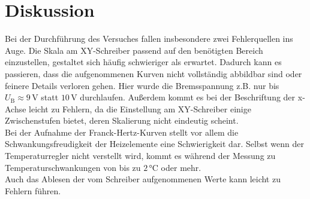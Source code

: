 \section{Diskussion}

Bei der Durchführung des Versuches fallen insbesondere zwei Fehlerquellen ins Auge.
Die Skala am XY-Schreiber passend auf den benötigten Bereich einzustellen, gestaltet sich häufig schwieriger als erwartet.
Dadurch kann es passieren, dass die aufgenommenen Kurven nicht vollständig abbildbar sind oder feinere Details verloren gehen.
Hier wurde die Bremsspannung z.B. nur bis $U_\text{B} \approx 9 \,\unit{\volt}$ statt $10 \,\unit{\volt}$ durchlaufen.
Außerdem kommt es bei der Beschriftung der x-Achse leicht zu Fehlern, da die Einstellung am XY-Schreiber einige Zwischenstufen bietet, deren Skalierung nicht eindeutig scheint. \\

Bei der Aufnahme der Franck-Hertz-Kurven stellt vor allem die Schwankungsfreudigkeit der Heizelemente eine Schwierigkeit dar.
Selbst wenn der Temperaturregler nicht verstellt wird, kommt es während der Messung zu Temperaturschwankungen von bis zu $2 \,\unit{\celsius}$ oder mehr. \\

Auch das Ablesen der vom Schreiber aufgenommenen Werte kann leicht zu Fehlern führen. \\


